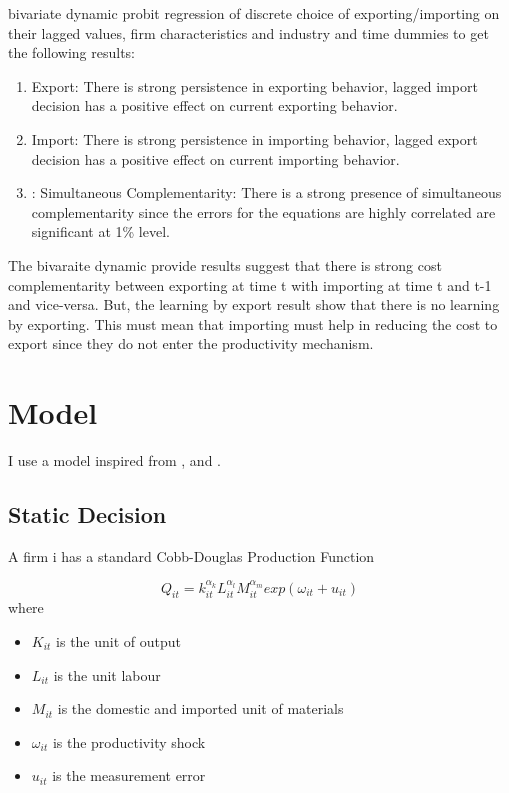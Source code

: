 \documentclass[11pt]{article}
\begin{document}
\begin{itemize}
  bivariate dynamic probit regression of discrete choice of
  exporting/importing on their lagged values, firm characteristics and
  industry and time dummies to get the following results:
\begin{enumerate}
\item Export: There is strong persistence in exporting behavior,
  lagged import decision has a positive effect on current exporting
  behavior. 
\item Import: There is strong persistence in importing behavior,
  lagged export decision has a positive effect on current importing
  behavior. 
\item: Simultaneous Complementarity: There is a strong presence of
  simultaneous complementarity since the errors for the equations are
  highly correlated are significant at 1\% level.  
\end{enumerate}
The bivaraite dynamic provide  results suggest that there is strong cost complementarity
between exporting at time t with importing at time t and t-1 and
vice-versa. But, the learning by export result show that there is no
learning by exporting. This must mean that importing must help in
reducing the cost to export since they do not enter the productivity
mechanism. 

\end{itemize}

\section{Model}

I use a model inspired from  \cite{aw2011}, \cite{de2011product} and \cite{kasahara2013productivity}. 

\subsection{Static Decision}

A firm i has a standard Cobb-Douglas Production Function 

\begin{equation}
Q_{it} =
k_{it}^{\alpha_k}L_{it}^{\alpha_l}M_{it}^{\alpha_m}exp(\omega_{it} + u_{it})
\end{equation}
where 
\begin{itemize}
\item $K_{it}$ is the unit of output
\item $L_{it}$ is the unit labour
\item $M_{it}$ is the domestic and imported unit of materials
\item $\omega_{it}$ is the productivity shock
\item $u_{it}$ is the measurement error
\end{itemize}
\end{document}
